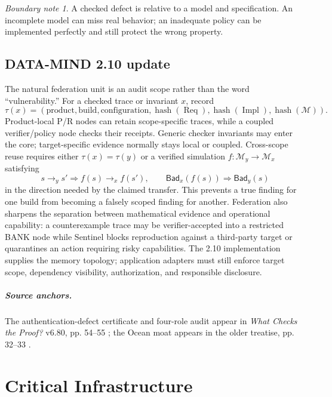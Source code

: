 \documentclass[11pt,oneside]{book}
\theoremstyle{definition}
\theoremstyle{remark}
\newtheorem{boundary}[theorem]{Boundary note}
\newcommand{\Req}{\operatorname{Req}}
\newcommand{\Impl}{\operatorname{Impl}}
\begin{document}
\begin{boundary}
A checked defect is relative to a model and specification. An incomplete model can miss real behavior;
an inadequate policy can be implemented perfectly and still protect the wrong property.
\end{boundary}

\section{DATA-MIND 2.10 update}
The natural federation unit is an audit scope rather than the word ``vulnerability.'' For a checked
trace or invariant \(x\), record
\[
\tau(x)=(\text{product},\text{build},\text{configuration},
\operatorname{hash}(\Req),\operatorname{hash}(\Impl),\operatorname{hash}(\mathcal M)).
\]
Product-local P/R nodes can retain scope-specific traces, while a coupled verifier/policy node checks
their receipts. Generic checker invariants may enter the core; target-specific evidence normally stays
local or coupled. Cross-scope reuse requires either \(\tau(x)=\tau(y)\) or a verified simulation
\(f:\mathcal M_y\to\mathcal M_x\) satisfying
\[
s\to_y s'\Longrightarrow f(s)\to_x f(s'),
\qquad
\mathsf{Bad}_x(f(s))\Longrightarrow\mathsf{Bad}_y(s)
\]
in the direction needed by the claimed transfer. This prevents a true finding for one build from
becoming a falsely scoped finding for another. Federation also sharpens the separation between
mathematical evidence and operational capability: a counterexample trace may be verifier-accepted
into a restricted BANK node while Sentinel blocks reproduction against a third-party target or
quarantines an action requiring risky capabilities. The 2.10 implementation supplies the memory
topology; application adapters must still enforce target scope, dependency visibility, authorization,
and responsible disclosure.

\paragraph{Source anchors.} The authentication-defect certificate and four-role audit appear in
\emph{What Checks the Proof?} v6.80, pp. 54--55 \cite{TennesonChecks}; the Ocean moat appears in
the older treatise, pp. 32--33 \cite{TennesonSecurity}.

\chapter{Critical Infrastructure}
\label{ch:infrastructure}
\end{document}
